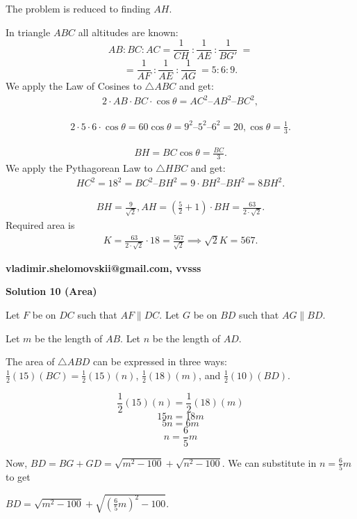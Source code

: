 \begin{enumerate}
 The problem is reduced to finding $AH$.

 In triangle $ABC$ all altitudes are known: 
 \[AB : BC : AC =  \frac{1}{CH}\ : \frac{1}{AE}\ : \frac{1}{BG'}\ =\]
 \[= \frac{1}{AF}\ :  \frac{1}{AE}\ :  \frac{1}{AG}\ = 5 : 6 : 9.\]We apply the Law of Cosines to $\triangle ABC$ and get$:$
 \begin{align*} 2\cdot AB\cdot BC \cdot \cos\theta = AC^2 – AB^2 – BC^2, \end{align*}

 \begin{align*} 2\cdot 5\cdot 6\cdot \cos\theta  = 60 \cos\theta  = 9^2 – 5^2 – 6^2 = 20, \cos\theta  =\frac{1}{3}. \end{align*}

 \begin{align*} BH = BC \cos\theta = \frac{BC}{3}.\end{align*}
We apply the Pythagorean Law to $\triangle HBC$ and get$:$
 \begin{align*} HC^2 = 18^2 = BC^2 – BH^2 = 9\cdot BH^2 – BH^2 = 8 BH^2.\end{align*}

 \begin{align*} BH =  \frac{9}{\sqrt2}, AH = (\frac{5}{2} + 1)\cdot BH =  \frac{63}{2\cdot \sqrt2}. \end{align*}
  Required area is
 \begin{align*}  K =  \frac{63}{2\cdot \sqrt{2}} \cdot 18 =  \frac{567}{\sqrt{2}} \implies \sqrt{2} K=\boxed{567}. \end{align*}
 

 \textbf{vladimir.shelomovskii@gmail.com, vvsss}

 



\textbf{Solution 10 (Area)}

Let $F$ be on $DC$ such that $AF \| DC$. Let $G$ be on $BD$ such that $AG \| BD$.

 Let $m$ be the length of $AB$. Let $n$ be the length of $AD$.

 The area of $\triangle ABD$ can be expressed in three ways: $\frac{1}{2}(15)(BC) = \frac{1}{2}(15)(n)$, $\frac{1}{2}(18)(m)$, and $\frac{1}{2}(10)(BD)$.

 
 \[\frac{1}{2}(15)(n) = \frac{1}{2}(18)(m)\]
 \[15n = 18m\]
 \[5n = 6m\]
 \[n = \frac{6}{5}m\]

 Now, $BD = BG + GD = \sqrt{m^2-100} + \sqrt{n^2-100}$. We can substitute in $n = \frac{6}{5}m$ to get

 $BD = \sqrt{m^2-100} + \sqrt{(\frac{6}{5}m)^2-100}$. 


\end{enumerate}
